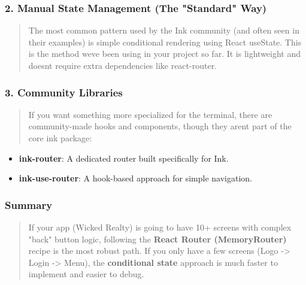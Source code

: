 \hypertarget{manual-state-management-the-standard-way}{%
\subsubsection{\texorpdfstring{\textbf{2. Manual State Management (The
"Standard"
Way)}}{2. Manual State Management (The "Standard" Way)}}\label{manual-state-management-the-standard-way}}

\begin{quote}
The most common pattern used by the Ink community (and often seen in
their examples) is simple conditional rendering using React useState.
This is the method we\textquotesingle ve been using in your project so
far. It is lightweight and doesn\textquotesingle t require extra
dependencies like react-router.
\end{quote}

\hypertarget{community-libraries}{%
\subsubsection{\texorpdfstring{\textbf{3. Community
Libraries}}{3. Community Libraries}}\label{community-libraries}}

\begin{quote}
If you want something more specialized for the terminal, there are
community-made hooks and components, though they aren\textquotesingle t
part of the core ink package:
\end{quote}

\begin{itemize}
\item
  \textbf{ink-router}: A dedicated router built specifically for Ink.
\item
  \textbf{ink-use-router}: A hook-based approach for simple navigation.
\end{itemize}

\hypertarget{summary}{%
\subsubsection{\texorpdfstring{\textbf{Summary}}{Summary}}\label{summary}}

\begin{quote}
If your app (Wicked Realty) is going to have 10+ screens with complex
"back" button logic, following the \textbf{React Router (MemoryRouter)}
recipe is the most robust path. If you only have a few screens (Logo
-\textgreater{} Login -\textgreater{} Menu), the \textbf{conditional
state} approach is much faster to implement and easier to debug.
\end{quote}

